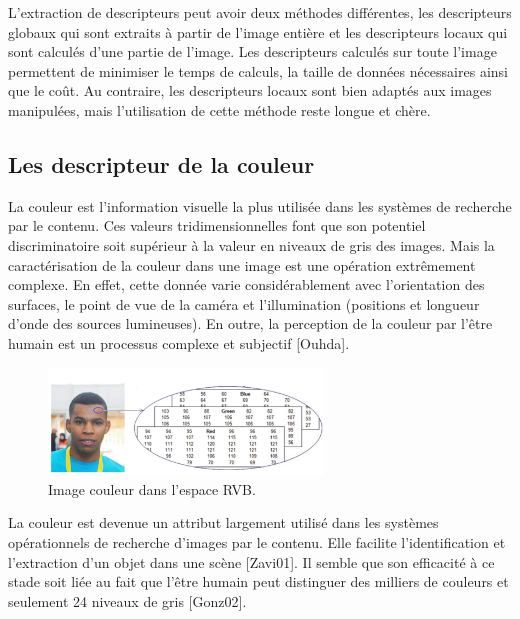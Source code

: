 L'extraction de descripteurs peut avoir deux méthodes différentes, les descripteurs globaux qui sont extraits à partir de l’image entière et les descripteurs locaux qui sont calculés d'une partie de l'image. Les descripteurs calculés sur toute l’image permettent de minimiser le temps de calculs, la taille de données nécessaires ainsi que le coût. Au contraire, les descripteurs locaux sont bien adaptés aux images manipulées, mais l’utilisation de cette méthode reste longue et chère.

 
\subsection{Les descripteur de la couleur}
La couleur est l’information visuelle la plus utilisée dans les systèmes de recherche par le contenu. Ces valeurs tridimensionnelles font que son potentiel discriminatoire soit supérieur à la valeur en niveaux de gris des images. Mais la caractérisation de la couleur dans une image est une opération extrêmement complexe. En effet, cette donnée varie considérablement avec l’orientation des surfaces, le point de vue de la caméra et l’illumination (positions et longueur d'onde des sources lumineuses). En outre, la perception de la couleur par l'être humain est un processus complexe et subjectif [Ouhda].

\begin{figure}[H]
	\label{fig:imageRVB}
	\centering
	\includegraphics[width=0.65\textwidth]{Figures/imageRVB} %
	
	\caption{Image couleur dans l’espace RVB.}
	
\end{figure}

La couleur est devenue un attribut largement utilisé dans les systèmes opérationnels de recherche d'images par le contenu. Elle facilite l'identification et l'extraction d'un objet dans une scène [Zavi01]. Il semble que son efficacité à ce stade soit liée au fait que l'être humain peut distinguer des milliers de couleurs et seulement 24 niveaux de gris [Gonz02].\\

